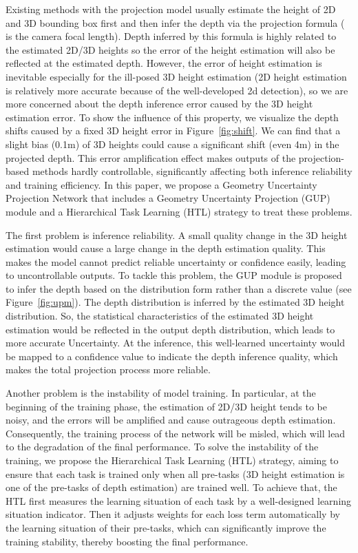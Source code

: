 \documentclass[10pt,twocolumn,letterpaper]{article}
\begin{document}
Existing methods with the projection model usually estimate the height of 2D and 3D bounding box first and then infer the depth via the projection formula  ( is the camera focal length). Depth inferred by this formula is highly related to the estimated 2D/3D heights so the error of the height estimation will also be reflected at the estimated depth. However, the error of height estimation is inevitable especially for the ill-posed 3D height estimation (2D height estimation is relatively more accurate because of the well-developed 2d detection), so we are more concerned about the depth inference error caused by the 3D height estimation error. To show the influence of this property, we visualize the depth shifts caused by a fixed 3D height error in Figure~\ref{fig:shift}.
We can find that a slight bias (0.1m) of 3D heights could cause a significant shift (even 4m) in the projected depth.
This error amplification effect makes outputs of the projection-based methods hardly controllable, significantly affecting both inference reliability and training efficiency. In this paper, we propose a Geometry Uncertainty Projection Network that includes a Geometry Uncertainty Projection (GUP) module and a Hierarchical Task Learning (HTL) strategy to treat these problems.

The first problem is inference reliability. A small quality change in the 3D height estimation would cause a large change in the depth estimation quality. This makes the model cannot predict reliable uncertainty or confidence easily, leading to uncontrollable outputs. To tackle this problem, the GUP module is proposed to infer the depth based on the distribution form rather than a discrete value (see Figure~\ref{fig:upm}). The depth distribution is inferred by the estimated 3D height distribution. So, the statistical characteristics of the estimated 3D height estimation would be reflected in the output depth distribution, which leads to more accurate Uncertainty. At the inference, this well-learned uncertainty would be mapped to a confidence value to indicate the depth inference quality, which makes the total projection process more reliable.   


Another problem is the instability of model training.
In particular, at the beginning of the training phase, the estimation of 2D/3D height tends to be noisy, and the errors will be amplified and cause outrageous depth estimation.
Consequently, the training process of the network will be misled, which will lead to the degradation of the final performance.
To solve the instability of the training, we propose the Hierarchical Task Learning (HTL) strategy, aiming to ensure that each task is trained only when all pre-tasks (\eg 3D height estimation is one of the pre-tasks of depth estimation) are trained well. 
To achieve that, the HTL first measures the learning situation of each task by a well-designed learning situation indicator.
Then it adjusts weights for each loss term automatically by the learning situation of their pre-tasks, which can significantly improve the training stability, thereby boosting the final performance.
\end{document}
